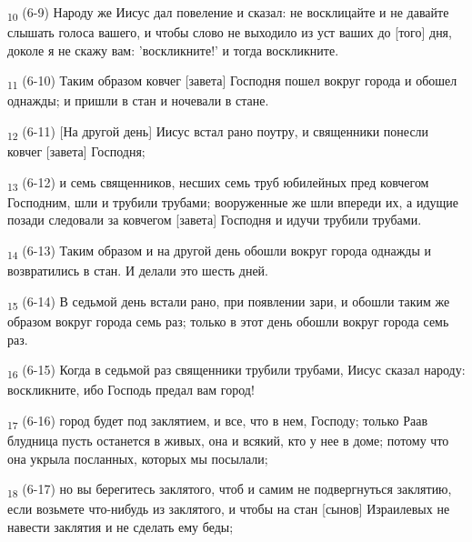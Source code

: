 \begin{tcolorbox}
\textsubscript{10} (6-9) Народу же Иисус дал повеление и сказал: не восклицайте и не давайте слышать голоса вашего, и чтобы слово не выходило из уст ваших до [того] дня, доколе я не скажу вам: 'воскликните!' и тогда воскликните.
\end{tcolorbox}
\begin{tcolorbox}
\textsubscript{11} (6-10) Таким образом ковчег [завета] Господня пошел вокруг города и обошел однажды; и пришли в стан и ночевали в стане.
\end{tcolorbox}
\begin{tcolorbox}
\textsubscript{12} (6-11) [На другой день] Иисус встал рано поутру, и священники понесли ковчег [завета] Господня;
\end{tcolorbox}
\begin{tcolorbox}
\textsubscript{13} (6-12) и семь священников, несших семь труб юбилейных пред ковчегом Господним, шли и трубили трубами; вооруженные же шли впереди их, а идущие позади следовали за ковчегом [завета] Господня и идучи трубили трубами.
\end{tcolorbox}
\begin{tcolorbox}
\textsubscript{14} (6-13) Таким образом и на другой день обошли вокруг города однажды и возвратились в стан. И делали это шесть дней.
\end{tcolorbox}
\begin{tcolorbox}
\textsubscript{15} (6-14) В седьмой день встали рано, при появлении зари, и обошли таким же образом вокруг города семь раз; только в этот день обошли вокруг города семь раз.
\end{tcolorbox}
\begin{tcolorbox}
\textsubscript{16} (6-15) Когда в седьмой раз священники трубили трубами, Иисус сказал народу: воскликните, ибо Господь предал вам город!
\end{tcolorbox}
\begin{tcolorbox}
\textsubscript{17} (6-16) город будет под заклятием, и все, что в нем, Господу; только Раав блудница пусть останется в живых, она и всякий, кто у нее в доме; потому что она укрыла посланных, которых мы посылали;
\end{tcolorbox}
\begin{tcolorbox}
\textsubscript{18} (6-17) но вы берегитесь заклятого, чтоб и самим не подвергнуться заклятию, если возьмете что-нибудь из заклятого, и чтобы на стан [сынов] Израилевых не навести заклятия и не сделать ему беды;
\end{tcolorbox}
